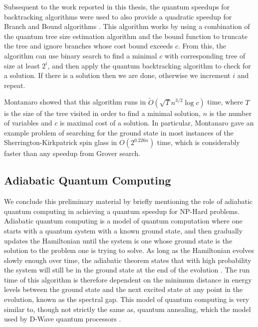 Subsequent to the work reported in this thesis, the quantum speedups for backtracking algorithms were used to also provide a quadratic speedup for Branch and Bound algorithms \cite{montanaro2019}. This algorithm works by using a combination of the quantum tree size estimation algorithm and the bound function to truncate the tree and ignore branches whose cost bound exceeds $c$. From this, the algorithm can use binary search to find a minimal $c$ with corresponding tree of size at least $2^i$, and then apply the quantum backtracking algorithm to check for a solution. If there is a solution then we are done, otherwise we increment $i$ and repeat.

Montanaro showed that this algorithm runs in $\tilde{O}(\sqrt{T}n^{3/2}\log c)$ time, where $T$ is the size of the tree visited in order to find a minimal solution, $n$ is the number of variables and $c$ is maximal cost of a solution. In particular, Montanaro gave an example problem of searching for the ground state in most instances of the Sherrington-Kirkpatrick spin glass in $O(2^{0.226n})$ time, which is considerably faster than any speedup from Grover search.

\subsection{Adiabatic Quantum Computing}

We conclude this preliminary material by briefly mentioning the role of adiabatic quantum computing in achieving a quantum speedup for NP-Hard problems. Adiabatic quantum computing is a model of quantum computation where one starts with a quantum system with a known ground state, and then gradually updates the Hamiltonian until the system is one whose ground state is the solution to the problem one is trying to solve. As long as the Hamiltonian evolves slowly enough over time, the adiabatic theorem states that with high probability the system will still be in the ground state at the end of the evolution \cite{das2008}. The run time of this algorithm is therefore dependent on the minimum distance in energy levels between the ground state and the next excited state at any point in the evolution, known as the spectral gap. This model of quantum computing is very similar to, though not strictly the same as, quantum annealing, which the model used by D-Wave quantum processors \cite{mcgeoch2019}.

